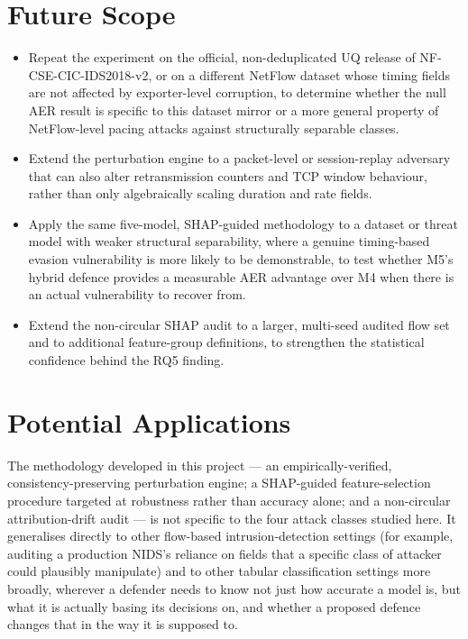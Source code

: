 \documentclass[12pt,a4paper]{report}
\begin{document}
\section{Future Scope}
\begin{itemize}\setlength\itemsep{2pt}\item Repeat the experiment on the official, non-deduplicated UQ release of NF-CSE-CIC-IDS2018-v2, or on a different NetFlow dataset whose timing fields are not affected by exporter-level corruption, to determine whether the null AER result is specific to this dataset mirror or a more general property of NetFlow-level pacing attacks against structurally separable classes.\end{itemize}
\begin{itemize}\setlength\itemsep{2pt}\item Extend the perturbation engine to a packet-level or session-replay adversary that can also alter retransmission counters and TCP window behaviour, rather than only algebraically scaling duration and rate fields.\end{itemize}
\begin{itemize}\setlength\itemsep{2pt}\item Apply the same five-model, SHAP-guided methodology to a dataset or threat model with weaker structural separability, where a genuine timing-based evasion vulnerability is more likely to be demonstrable, to test whether M5's hybrid defence provides a measurable AER advantage over M4 when there is an actual vulnerability to recover from.\end{itemize}
\begin{itemize}\setlength\itemsep{2pt}\item Extend the non-circular SHAP audit to a larger, multi-seed audited flow set and to additional feature-group definitions, to strengthen the statistical confidence behind the RQ5 finding.\end{itemize}
\section{Potential Applications}
The methodology developed in this project --- an empirically-verified, consistency-preserving perturbation engine; a SHAP-guided feature-selection procedure targeted at robustness rather than accuracy alone; and a non-circular attribution-drift audit --- is not specific to the four attack classes studied here. It generalises directly to other flow-based intrusion-detection settings (for example, auditing a production NIDS's reliance on fields that a specific class of attacker could plausibly manipulate) and to other tabular classification settings more broadly, wherever a defender needs to know not just how accurate a model is, but what it is actually basing its decisions on, and whether a proposed defence changes that in the way it is supposed to.
\end{document}
